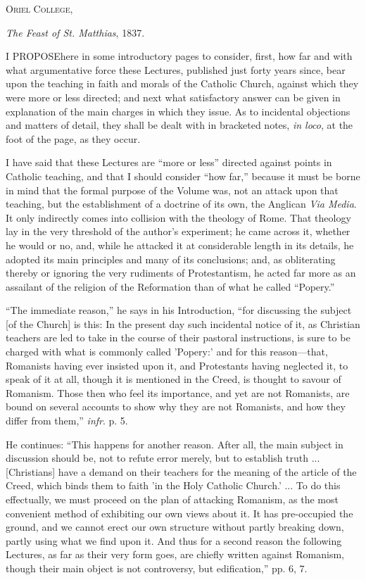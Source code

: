 O\textsc{riel} C\textsc{ollege},

\emph{The Feast of St. Matthias}, 1837.


I PROPOSE\textbf{}here in some introductory pages to consider,
first, how far and with what argumentative force these Lectures,
published just forty years since, bear upon the teaching in faith and
morals of the Catholic Church, against which they were more or less
directed; and next what satisfactory answer can be given in
explanation of the main charges in which they issue. As to incidental
objections and matters of detail, they shall be dealt with in
bracketed notes, \emph{in loco}, at the foot of the page, as they
occur.


I have said that these Lectures are ``more or less''
directed against points in Catholic teaching, and that I should
consider ``how far,'' because it must be borne in mind that
the formal purpose of the Volume was, not an attack upon that
teaching, but the establishment of a doctrine of its own, the Anglican
\emph{Via Media}. It only indirectly comes into collision with the
theology of Rome. That theology lay in the very threshold of the
author's experiment; he came across it, whether he would or no, and,
while he attacked it at considerable length in its details, he
adopted its main principles and many of its conclusions; and, as
obliterating thereby or ignoring the very rudiments of Protestantism,
he acted far more as an assailant of the religion of the Reformation
than of what he called ``Popery.''

``The immediate reason,'' he says in his Introduction,
``for discussing the subject [of the Church] is this: In the
present day such incidental notice of it, as Christian teachers are
led to take in the course of their pastoral instructions, is sure to
be charged with what is commonly called 'Popery:' and for this reason—that,
Romanists having ever insisted upon it, and Protestants having
neglected it, to speak of it at all, though it is mentioned in the
Creed, is thought to savour of Romanism. Those then who feel its
importance, and yet are not Romanists, are bound on several accounts
to show why they are not Romanists, and how they differ from
them,'' \emph{infr}. p. 5.

He continues: ``This happens for another reason. After all, the
main subject in discussion should be, not to refute error merely, but
to establish truth ... [Christians] have a demand on their teachers
for the meaning of the article of the Creed, which binds them to faith
'in the Holy Catholic Church.' ... To do this effectually, we must
proceed on the plan of attacking Romanism, as the most convenient
method of exhibiting our own views about it. It has
pre-occupied the ground, and we cannot erect our own structure without
partly breaking down, partly using what we find upon it. And thus for
a second reason the following Lectures, as far as their very form
goes, are chiefly written against Romanism, though their main object
is not controversy, but edification,'' pp. 6, 7.

